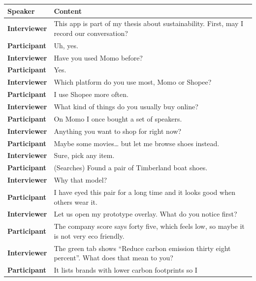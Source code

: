 \documentclass[
  12pt,
  letterpaper,
  DIV=11,
  numbers=noendperiod]{scrartcl}
\begin{document}
\begin{longtable}[]{@{}
  >{\raggedright\arraybackslash}p{}
  >{\raggedright\arraybackslash}p{}@{}}
\toprule\noalign{}
\begin{minipage}[b]{\linewidth}\raggedright
Speaker
\end{minipage} & \begin{minipage}[b]{\linewidth}\raggedright
Content
\end{minipage} \\
\midrule\noalign{}
\endhead
\bottomrule\noalign{}
\endlastfoot
\textbf{Interviewer} & This app is part of my thesis about
sustainability. First, may I record our conversation? \\
\textbf{Participant} & Uh, yes. \\
\textbf{Interviewer} & Have you used Momo before? \\
\textbf{Participant} & Yes. \\
\textbf{Interviewer} & Which platform do you use most, Momo or
Shopee? \\
\textbf{Participant} & I use Shopee more often. \\
\textbf{Interviewer} & What kind of things do you usually buy online? \\
\textbf{Participant} & On Momo I once bought a set of speakers. \\
\textbf{Interviewer} & Anything you want to shop for right now? \\
\textbf{Participant} & Maybe some movies\ldots{} but let me browse shoes
instead. \\
\textbf{Interviewer} & Sure, pick any item. \\
\textbf{Participant} & (Searches) Found a pair of Timberland boat
shoes. \\
\textbf{Interviewer} & Why that model? \\
\textbf{Participant} & I have eyed this pair for a long time and it
looks good when others wear it. \\
\textbf{Interviewer} & Let us open my prototype overlay. What do you
notice first? \\
\textbf{Participant} & The company score says forty five, which feels
low, so maybe it is not very eco friendly. \\
\textbf{Interviewer} & The green tab shows ``Reduce carbon emission
thirty eight percent''. What does that mean to you? \\
\textbf{Participant} & It lists brands with lower carbon footprints so I

\end{longtable}
\end{document}
